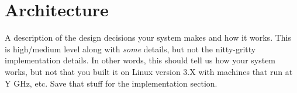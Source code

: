 \section{Architecture}

A description of the design decisions your system makes and how it works.  This
is high/medium level along with \emph{some} details, but not the nitty-gritty
implementation details.  In other words, this should tell us how your system
works, but not that you built it on Linux version 3.X with machines that run at
Y GHz, etc.  Save that stuff for the implementation section.
